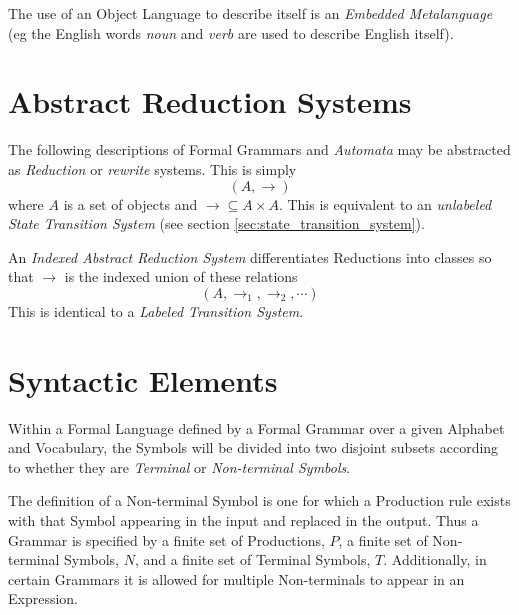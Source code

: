 \documentclass{article}
\begin{document}
The use of an Object Language to describe itself is an \emph{Embedded
  Metalanguage} (eg the English words \emph{noun} and \emph{verb} are
used to describe English itself).


\section{Abstract Reduction Systems}\label{sec:abstract_rewrite}
The following descriptions of Formal Grammars and \emph{Automata} may
be abstracted as \emph{Reduction} or \emph{rewrite} systems. This is
simply
    \[(A,\rightarrow)\]
where $A$ is a set of objects and $\rightarrow \subseteq A \times
A$. This is equivalent to an \emph{unlabeled State Transition System}
(see section \ref{sec:state_transition_system}).

An \emph{Indexed Abstract Reduction System} differentiates Reductions
into classes so that $\rightarrow$ is the indexed union of these
relations
    \[(A, \rightarrow_1, \rightarrow_2, \cdots)\]
This is identical to a \emph{Labeled Transition System}.


\section{Syntactic Elements}

Within a Formal Language defined by a Formal Grammar over a given
Alphabet and Vocabulary, the Symbols will be divided into two disjoint
subsets according to whether they are \emph{Terminal} or
\emph{Non-terminal Symbols}.

The definition of a Non-terminal Symbol is one for which a Production
rule exists with that Symbol appearing in the input and replaced in
the output. Thus a Grammar is specified by a finite set of
Productions, $P$, a finite set of Non-terminal Symbols, $N$, and a
finite set of Terminal Symbols, $T$. Additionally, in certain Grammars
it is allowed for multiple Non-terminals to appear in an Expression.
\end{document}
